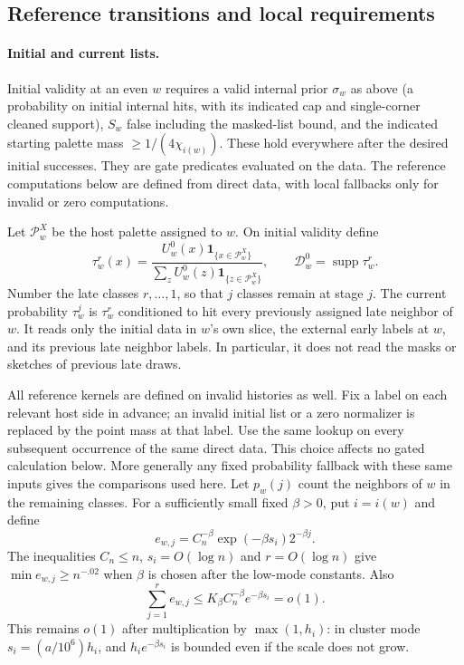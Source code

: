 \subsection{Reference transitions and local requirements}
\label{sec:reference-late-transitions}

\paragraph{Initial and current lists.}
Initial validity at an even \(w\) requires a valid internal prior
\(\sigma_w\) as above (a probability on initial internal hits, with its
indicated cap and single-corner cleaned support), \(S_w\) false including
the masked-list bound, and the indicated starting palette mass
\(\ge1/(4\chi_{i(w)})\). These hold everywhere after the desired initial
successes. They are gate predicates evaluated on the data. The reference
computations below are defined from direct data, with local fallbacks only
for invalid or zero computations.

Let \(\mathcal P_w^X\) be the host palette assigned to \(w\). On initial validity define
\[
 \tau_w^r(x)=\frac{U_w^0(x)\mathbf1_{\{x\in\mathcal P_w^X\}}}
 {\sum_z U_w^0(z)\mathbf1_{\{z\in\mathcal P_w^X\}}},
 \qquad \mathcal D_w^0=\operatorname{supp}\tau_w^r.
\]
Number the late classes \(r,\ldots,1\), so that \(j\) classes remain at
stage \(j\). The current probability \(\tau_w^j\) is \(\tau_w^r\)
conditioned to hit every previously assigned late neighbor of \(w\).
It reads only the initial data in \(w\)'s own slice, the external early
labels at \(w\), and its previous late neighbor labels. In particular,
it does not read the masks or sketches of previous late draws.

All reference kernels are defined on invalid histories as well. Fix a
label on each relevant host side in advance; an invalid initial list or
a zero normalizer is replaced by the point mass at that label. Use the
same lookup on every subsequent occurrence of the same direct data.
This choice affects no gated calculation below. More generally any fixed
probability fallback with these same inputs gives the comparisons used
here. Let \(p_w(j)\) count the neighbors of \(w\) in the remaining
classes. For a sufficiently small fixed \(\beta>0\), put
\(i=i(w)\) and define
\[
 e_{w,j}=C_n^{-\beta}\exp(-\beta s_i)2^{-\beta j}.
\]
The inequalities \(C_n\le n\), \(s_i=O(\log n)\) and
\(r=O(\log n)\) give \(\min e_{w,j}\ge n^{-.02}\) when \(\beta\)
is chosen after the low-mode constants. Also
\[
 \sum_{j=1}^r e_{w,j}
 \le K_\beta C_n^{-\beta}e^{-\beta s_i}=o(1).
\]
This remains \(o(1)\) after multiplication by \(\max(1,h_i)\): in
cluster mode \(s_i=(a/10^6)h_i\), and \(h_i e^{-\beta s_i}\) is
bounded even if the scale does not grow.

